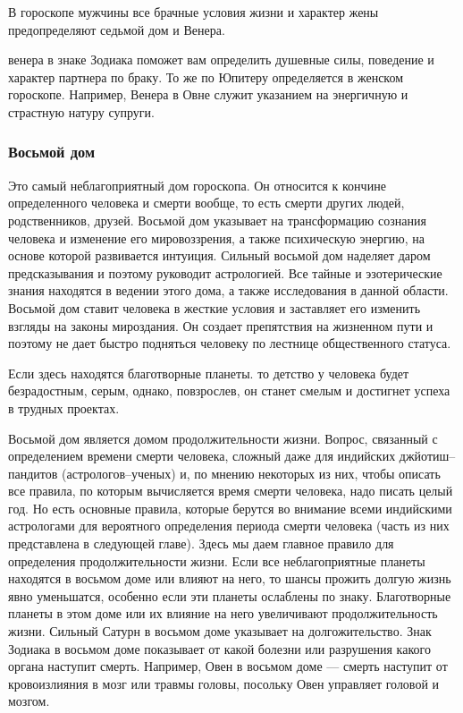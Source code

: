 В гороскопе мужчины все брачные условия жизни и характер жены предопределяют седьмой дом и Венера.

венера в знаке Зодиака поможет вам определить душевные силы, поведение и характер партнера по браку. То же по Юпитеру определяется в женском гороскопе. Например, Венера в Овне служит указанием на энергичную и страстную натуру супруги.

\subsubsection*{Восьмой дом}

Это самый неблагоприятный дом гороскопа. Он относится к кончине определенного человека и смерти вообще, то есть смерти других людей, родственников, друзей. Восьмой дом указывает на трансформацию сознания человека и изменение его мировоззрения, а также психическую энергию, на основе которой развивается интуиция. Сильный восьмой дом наделяет даром предсказывания и поэтому руководит астрологией. Все тайные и эзотерические знания находятся в ведении этого дома, а также исследования в данной области. Восьмой дом ставит человека в жесткие условия и заставляет его изменить взгляды на законы мироздания. Он создает препятствия на жизненном пути и поэтому не дает быстро подняться человеку по лестнице общественного статуса.

Если здесь находятся благотворные планеты. то детство у человека будет безрадостным, серым, однако, повзрослев, он станет смелым и достигнет успеха в трудных проектах.

Восьмой дом является домом продолжительности жизни. Вопрос, связанный с определением времени смерти человека, сложный даже для индийских джйотиш--пандитов (астрологов--ученых) и, по мнению некоторых из них, чтобы описать все правила, по которым вычисляется время смерти человека, надо писать целый год. Но есть основные правила, которые берутся во внимание всеми индийскими астрологами для вероятного определения периода смерти человека (часть из них представлена в следующей главе). Здесь мы даем главное правило для определения продолжительности жизни. Если все неблагоприятные планеты находятся в восьмом доме или влияют на него, то шансы прожить долгую жизнь явно уменьшатся, особенно если эти планеты ослаблены по знаку. Благотворные планеты в этом доме или их влияние на него увеличивают продолжительность жизни. Сильный Сатурн в восьмом доме указывает на долгожительство. Знак Зодиака в восьмом доме показывает от какой болезни или разрушения какого органа наступит смерть. Например, Овен в восьмом доме --- смерть наступит от кровоизлияния в мозг или травмы головы, посольку Овен управляет головой и мозгом.

